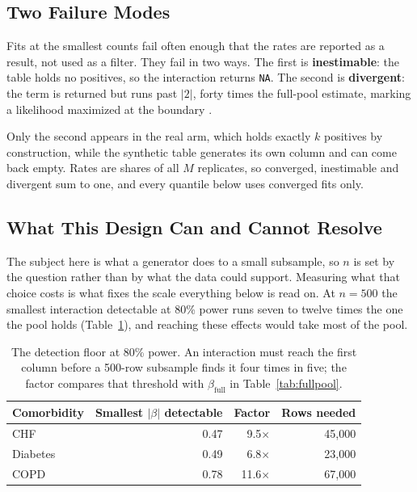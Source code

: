 \documentclass[11pt]{article}
\begin{document}
\subsection{Two Failure Modes}
\label{sec:failure}

Fits at the smallest counts fail often enough that the rates are reported as a
result, not used as a filter. They fail in two ways. The first is
\textbf{inestimable}: the table holds no positives, so the interaction returns
\texttt{NA}. The second is \textbf{divergent}: the term is returned but runs
past $|2|$, forty times the full-pool estimate, marking a likelihood maximized
at the boundary \cite{heinze2002}.

Only the second appears in the real arm, which holds exactly $k$ positives by
construction, while the synthetic table generates its own column and can come
back empty. Rates are shares of all $M$ replicates, so converged, inestimable
and divergent sum to one, and every quantile below uses converged fits only.

\subsection{What This Design Can and Cannot Resolve}
\label{sec:scope}

The subject here is what a generator does to a small subsample, so $n$ is set by
the question rather than by what the data could support. Measuring what that
choice costs is what fixes the scale everything below is read on. At $n = 500$
the smallest interaction detectable at 80\% power runs seven to twelve times the
one the pool holds (Table~\ref{tab:floor}), and reaching these effects would
take most of the pool.

\begin{table}[H]
\centering
\begin{tabular}{lrrr}
\toprule
Comorbidity & Smallest $|\beta|$ detectable & Factor & Rows needed \\
\midrule
CHF      & 0.47 & 9.5$\times$  & 45{,}000 \\
Diabetes & 0.49 & 6.8$\times$  & 23{,}000 \\
COPD     & 0.78 & 11.6$\times$ & 67{,}000 \\
\bottomrule
\end{tabular}
\caption{The detection floor at 80\% power. An interaction must reach the first
column before a 500-row subsample finds it four times in five; the factor
compares that threshold with $\hat\beta_{\text{full}}$ in
Table~\ref{tab:fullpool}.}
\label{tab:floor}
\end{table}
\end{document}
